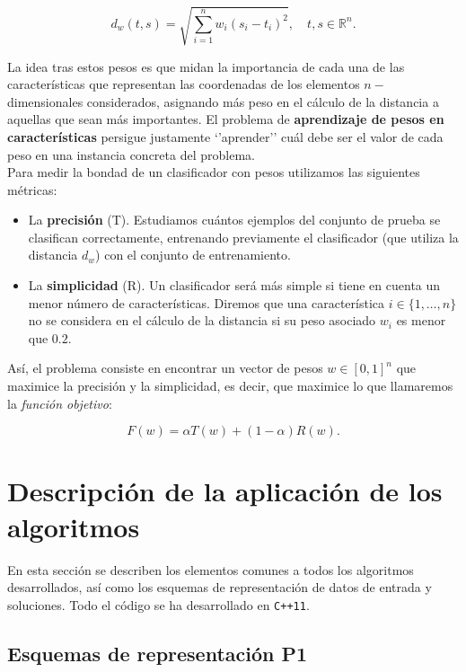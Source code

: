 \documentclass[12pt]{article}
\begin{document}
\[
    d_w(t, s) = \sqrt{\sum_{i=1}^n w_i (s_i - t_i)^2}, \quad t, s \in \mathbb{R}^n.
\]
\vspace{.5em}

La idea tras estos pesos es que midan la importancia de cada una de las características que representan las coordenadas de los elementos $n-$dimensionales considerados, asignando más peso en el cálculo de la distancia a aquellas que sean más importantes. El problema de \textbf{aprendizaje de pesos en características} persigue justamente `'aprender'' cuál debe ser el valor de cada peso en una instancia concreta del problema.\\

Para medir la bondad de un clasificador con pesos utilizamos las siguientes métricas:

\begin{itemize}
	\item La \textbf{precisión} (T). Estudiamos cuántos ejemplos del conjunto de prueba se clasifican correctamente, entrenando previamente el clasificador (que utiliza la distancia $d_w$) con el conjunto de entrenamiento.
	\item La \textbf{simplicidad} (R). Un clasificador será más simple si tiene en cuenta un menor número de características. Diremos que una característica $i \in \{1, \dots, n\}$ no se considera en el cálculo de la distancia si su peso asociado $w_i$ es menor que $0.2$. 
\end{itemize}

Así, el problema consiste en encontrar un vector de pesos $w \in [0,1]^n$ que maximice la precisión y la simplicidad, es decir, que maximice lo que llamaremos la \textit{función objetivo}:

\[
    F(w) = \alpha T(w) + (1 - \alpha) R(w).
\]

\newpage

\section{Descripción de la aplicación de los algoritmos}

En esta sección se describen los elementos comunes a todos los algoritmos desarrollados, así como los esquemas de representación de datos de entrada y soluciones. Todo el código se ha desarrollado en \verb|C++11|.


\subsection*{{\color{red}Esquemas de representación P1}}
\end{document}
